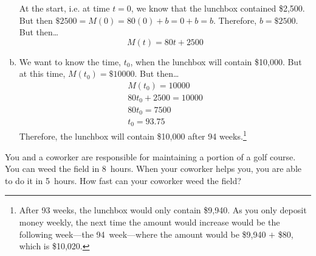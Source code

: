 \documentclass[12pt,letterpaper]{exam}
\begin{document}
\begin{questions}
\begin{enumerate}[(a)]
At the start, i.e. at time $t= 0$, we know that the lunchbox contained \$2,500. But then $\$2500= M(0)= 80(0) + b= 0 + b= b$. Therefore, $b= \$2500$. But then\dots
	\[
	M(t)= 80t + 2500
	\] \pspace

\item We want to know the time, $t_0$, when the lunchbox will contain \$10,000. But at this time, $M(t_0)= \$10000$. But then\dots
	\[
	\begin{gathered}
	M(t_0)= 10000 \\
	80t_0 + 2500= 10000 \\
	80t_0= 7500 \\
	t_0= 93.75
	\end{gathered}
	\]
Therefore, the lunchbox will contain \$10,000 after 94 weeks.\footnote{After 93 weeks, the lunchbox would only contain \$9,940. As you only deposit money weekly, the next time the amount would increase would be the following week---the 94~week---where the amount would be \$9,940 $+$ \$80, which is \$10,020.}
\end{enumerate}



\newpage
\question[10] You and a coworker are responsible for maintaining a portion of a golf course. You can weed the field in 8~hours. When your coworker helps you, you are able to do it in 5~hours. How fast can your coworker weed the field? \pspace


\end{questions}
\end{document}
